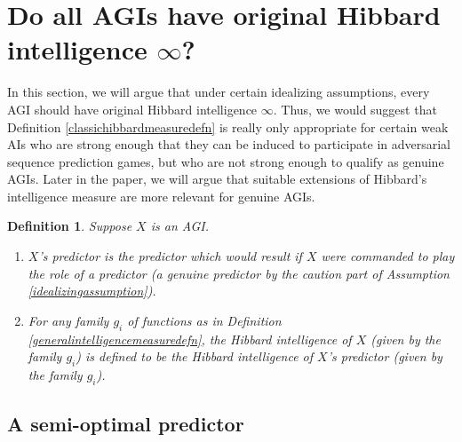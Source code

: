 \documentclass{article}
\newtheorem{definition}[theorem]{Definition}
\begin{document}
\section{Do all AGIs have original Hibbard intelligence $\infty$?}
\label{trivialitysection}

In this section, we will argue that under certain idealizing
assumptions, every AGI should have original Hibbard intelligence $\infty$.
Thus, we would suggest that Definition \ref{classichibbardmeasuredefn} is really
only appropriate for certain weak AIs who are strong enough that they can be
induced to participate in adversarial sequence prediction games, but who are
not strong enough to qualify as genuine AGIs. Later in the paper, we will argue
that suitable extensions of Hibbard's intelligence measure are more relevant
for genuine AGIs.

\begin{definition}
\label{Xspredictordefn}
    Suppose $X$ is an AGI.
    \begin{enumerate}
        \item
        \emph{$X$'s predictor} is the predictor which
        would result if $X$ were commanded to play the role of a predictor (a
        genuine predictor by the \emph{caution} part of Assumption
        \ref{idealizingassumption}).
        \item
        For any family $g_i$ of functions as in
        Definition \ref{generalintelligencemeasuredefn},
        the \emph{Hibbard intelligence of $X$ (given by the family $g_i$)}
        is defined to be the Hibbard intelligence of
        $X$'s predictor (given by the family $g_i$).
    \end{enumerate}
\end{definition}

\subsection{A semi-optimal predictor}
\label{semioptimalpredictorsubsection}
\end{document}
